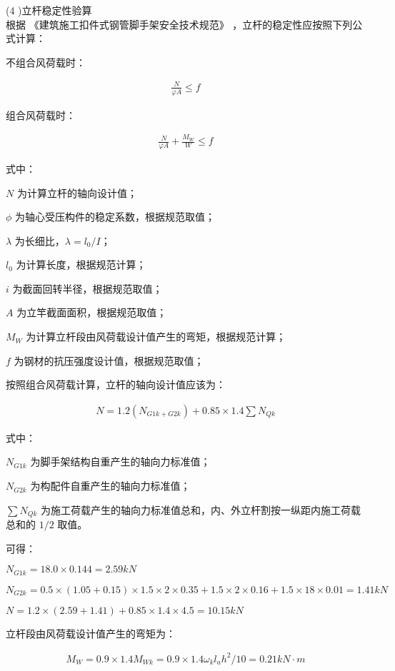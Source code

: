 (4 )立杆稳定性验算\\

根据 《建筑施工扣件式钢管脚手架安全技术规范》 ，立杆的稳定性应按照下列公式计算：

不组合风荷载时：

\begin{align}
    \label{fx:nw}
    \frac{N}{\varphi A}\leq f
\end{align}

组合风荷载时：

\begin{align}
    \label{fx:w}
    \frac{N}{\varphi A}+ \frac{M_W}{W}\leq f
\end{align}

式中：

$N$ 为计算立杆的轴向设计值；

$\phi$ 为轴心受压构件的稳定系数，根据规范取值；

$\lambda$ 为长细比，$\lambda =l_0/I$；

$l_0$ 为计算长度，根据规范计算；

$i$ 为截面回转半径，根据规范取值；

$A$ 为立竿截面面积，根据规范取值；

$M_W$ 为计算立杆段由风荷载设计值产生的弯矩，根据规范计算；

$f$ 为钢材的抗压强度设计值，根据规范取值；

按照组合风荷载计算，立杆的轴向设计值应该为：

\begin{align}
    N=1.2(N_{G1k+G2k})+0.85\times 1.4\sum N_{Qk}
\end{align}

式中：

$N_{G1k}$ 为脚手架结构自重产生的轴向力标准值； 

$N_{G2k}$ 为构配件自重产生的轴向力标准值；

$\sum N_{Qk}$ 为施工荷载产生的轴向力标准值总和，内、外立杆割按一纵距内施工荷载
总和的 $1/2$ 取值。

可得：

$N_{G1k}=18.0\times 0.144=2.59 kN$

$N_{G2k}=0.5\times (1.05+0.15)\times 1.5\times 2\times 0.35+1.5\times 2\times 0.16+1.5\times 18\times 0.01=1.41 kN$

$N=1.2\times (2.59+1.41)+0.85\times 1.4\times 4.5=10.15 kN$

立杆段由风荷载设计值产生的弯矩为：

\begin{align}
    M_W=0.9\times 1.4M_{Wk}=0.9\times 1.4\omega _kl_ah^2/10=0.21kN\cdot m
\end{align}

